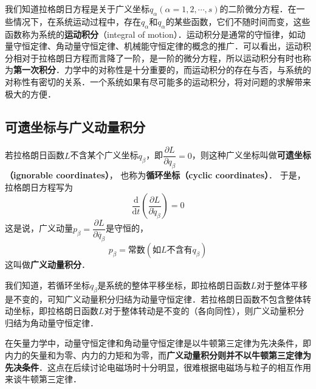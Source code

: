 

我们知道拉格朗日方程是关于广义坐标$q_\alpha(\alpha=1,2,\cdots,s)$的二阶微分方程．在一些情况下，在系统运动过程中，存在$q_\alpha$和$\dot{q}_\alpha$的某些函数，它们不随时间而变，这些函数称为系统的\textbf{运动积分}（integral of motion）．运动积分是通常的守恒律，如动量守恒定律、角动量守恒定律、机械能守恒定律的概念的推广．可以看出，运动积分相对于拉格朗日方程而言降了一阶，是一阶的微分方程，所以运动积分有时也称为\textbf{第一次积分}．力学中的对称性是十分重要的，而运动积分的存在与否，与系统的对称性有密切的关系．一个系统如果有尽可能多的运动积分，将对问题的求解带来极大的方便．

\subsection{可遗坐标与广义动量积分}

若拉格朗日函数$L$不含某个广义坐标$q_\beta$，即$\dfrac{\partial L}{\partial q_\beta}=0$，则这种广义坐标叫做\textbf{可遗坐标（ignorable coordinates）}， 也称为\textbf{循环坐标（cyclic coordinates）}． 于是， 拉格朗日方程写为
\begin{equation}
\frac{\mathrm{d}}{\mathrm{d} t}\left(\frac{\partial L}{\partial \dot{q}_{\beta}}\right)=0
\end{equation}
这是说，广义动量$p_\beta=\dfrac{\partial L} {\partial \dot{q_\beta}}$是守恒的，
\begin{equation}
p_\beta=常数(如L不含有q_\beta)
\end{equation}
这叫做\textbf{广义动量积分}．

我们知道，若循环坐标$q_\beta$是系统的整体平移坐标，即拉格朗日函数$L $对于整体平移是不变的，可知广义动量积分归结为动量守恒定律．若拉格朗日函数不包含整体转动坐标，即拉格朗日函数$L$对于整体转动是不变的（各向同性），则广义动量积分归结为角动量守恒定律．

在矢量力学中，动量守恒定律和角动量守恒定律是以牛顿第三定律为先决条件，即内力的矢量和为零、内力的力矩和为零，而\textbf{广义动量积分则并不以牛顿第三定律为先决条件}．这点在后续讨论电磁场时十分明显，很难根据电磁场与粒子的相互作用来谈牛顿第三定律．


